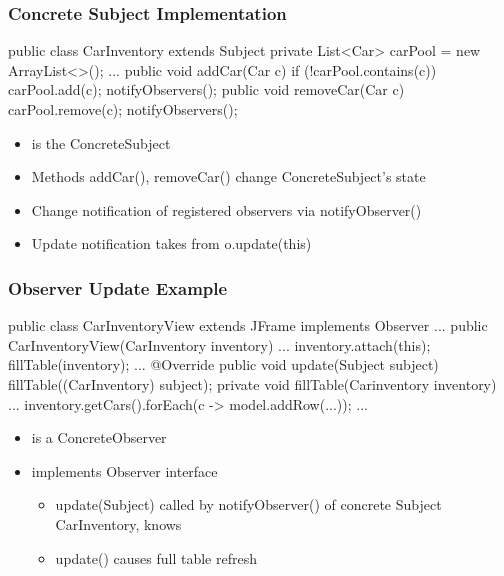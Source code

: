 \subsubsection{Concrete Subject Implementation}
\begin{codeBlock}{}
    public class CarInventory extends Subject{
        private List<Car> carPool = new ArrayList<>();
        ...
        public void addCar(Car c){
            if (!carPool.contains(c)){
                carPool.add(c);
            }
            notifyObservers();
        }
        public void removeCar(Car c){
            carPool.remove(c);
            notifyObservers();
        }
    }
\end{codeBlock}
\begin{itemize}
    \item {} is the ConcreteSubject
    \item Methods addCar(), removeCar() change ConcreteSubject's state
    \item Change notification of registered observers via notifyObserver()
    \item Update notification takes from o.update(this)
\end{itemize}
\subsubsection{Observer Update Example}
\begin{codeBlock}{}
    public class CarInventoryView extends JFrame implements Observer{
        ...
        public CarInventoryView(CarInventory inventory){
            ...
            inventory.attach(this);
            fillTable(inventory);
            ...
        }
        @Override
        public void update(Subject subject){
            fillTable((CarInventory) subject);
        }
        private void fillTable(Carinventory inventory){
            ...
            inventory.getCars().forEach(c -> model.addRow(...));
        }
        ...
    }
\end{codeBlock}
\begin{itemize}
    \item is a ConcreteObserver
    \item implements Observer interface
    \begin{itemize}
        \item update(Subject) called by notifyObserver() of concrete Subject CarInventory, knows 
        \item update() causes full table refresh
    \end{itemize}
\end{itemize}
